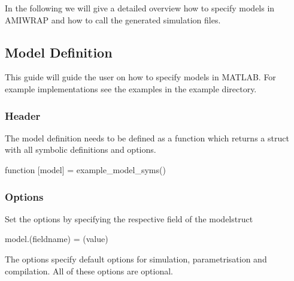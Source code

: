 In the following we will give a detailed overview how to specify models in A\+M\+I\+W\+R\+A\+P and how to call the generated simulation files.\hypertarget{def_simu_definition}{}\subsection{Model Definition}\label{def_simu_definition}
This guide will guide the user on how to specify models in M\+A\+T\+L\+A\+B. For example implementations see the examples in the example directory.\hypertarget{def_simu_header}{}\subsubsection{Header}\label{def_simu_header}
The model definition needs to be defined as a function which returns a struct with all symbolic definitions and options.


\begin{DoxyCode}
\textcolor{keyword}{function} [model] = example\_model\_syms() 
\end{DoxyCode}
\hypertarget{def_simu_options}{}\subsubsection{Options}\label{def_simu_options}
Set the options by specifying the respective field of the modelstruct


\begin{DoxyCode}
model.(fieldname) = (value) 
\end{DoxyCode}


The options specify default options for simulation, parametrisation and compilation. All of these options are optional.

